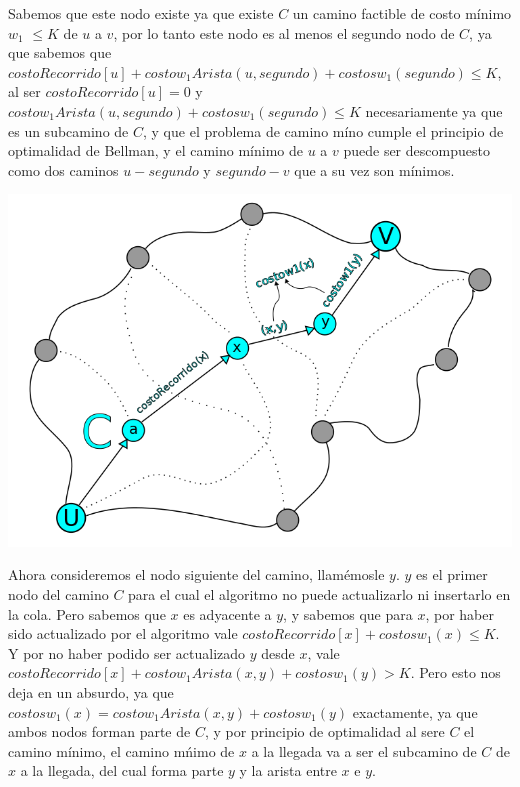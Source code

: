 \vspace{2mm}

Sabemos que este nodo existe ya que existe $C$ un camino factible de costo m\'inimo $w_1$ $\leq K$ de $u$ a $v$, por lo tanto este nodo es al menos el segundo nodo de $C$, ya que sabemos que $costoRecorrido[u] + costow_1Arista(u,segundo) + costosw_1(segundo) \leq K $, al ser $costoRecorrido[u]=0$ y $costow_1Arista(u,segundo) + costosw_1(segundo)\leq K$ necesariamente ya que es un subcamino de $C$, y que el problema de camino m\'ino cumple el principio de optimalidad de Bellman, y el camino m\'inimo de $u$ a $v$ puede ser descompuesto como dos caminos $u-segundo$ y $segundo-v$ que a su vez son m\'inimos.

\vspace{2mm}

\includegraphics[scale=0.6]{img/caminoC.png}

Ahora consideremos el nodo siguiente del camino, llam\'emosle $y$. $y$ es el primer nodo del camino $C$ para el cual el algoritmo no puede actualizarlo ni insertarlo en la cola. Pero sabemos que $x$ es adyacente a $y$, y sabemos que para $x$, por haber sido actualizado por el algoritmo vale $costoRecorrido[x] + costosw_1(x) \leq K$. Y por no haber podido ser actualizado $y$ desde $x$, vale $costoRecorrido[x] + costow_1Arista(x,y) + costosw_1(y)  > K$. Pero esto nos deja en un absurdo, ya que $costosw_1(x)=  costow_1Arista(x,y) + costosw_1(y)$ exactamente, ya que ambos nodos forman parte de $C$, y por principio de optimalidad al sere $C$ el camino m\'inimo,  el camino m\'nimo de $x$ a la llegada va a ser el subcamino de $C$ de $x$ a la llegada, del cual forma parte $y$ y la arista entre $x$ e $y$.	

